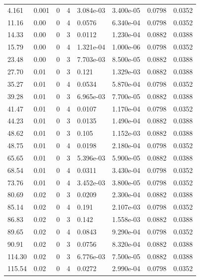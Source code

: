 \documentclass[preview]{standalone}
\begin{document}
{{\begin{tabular}{L{1.2cm}C{1.2cm} C{0.3cm}C{0.5cm} C{1.4cm}C{1.4cm} C{1.4cm}C{1.4cm}}
  4.161  &  0.001  & 0     &  4 &  3.084e-03  & 3.400e-05  & 0.0798 &  0.0352   \\ 
  11.16  &  0.00  & 0     &  4 &  0.0576  & 6.340e-04  & 0.0798 &  0.0352   \\ 
  14.33  &  0.00  & 0     &  3 &  0.0112  & 1.230e-04  & 0.0882 &  0.0388   \\ 
  15.79  &  0.00  & 0     &  4 &  1.321e-04  & 1.000e-06  & 0.0798 &  0.0352   \\ 
  23.48  &  0.00  & 0     &  3 &  7.703e-03  & 8.500e-05  & 0.0882 &  0.0388   \\ 
  27.70  &  0.01  & 0     &  3 &  0.121  & 1.329e-03  & 0.0882 &  0.0388   \\ 
  35.27  &  0.01  & 0     &  4 &  0.0534  & 5.870e-04  & 0.0798 &  0.0352   \\ 
  39.28  &  0.01  & 0     &  3 &  6.965e-03  & 7.700e-05  & 0.0882 &  0.0388   \\ 
  41.47  &  0.01  & 0     &  4 &  0.0107  & 1.170e-04  & 0.0798 &  0.0352   \\ 
  44.23  &  0.01  & 0     &  3 &  0.0135  & 1.490e-04  & 0.0882 &  0.0388   \\ 
  48.62  &  0.01  & 0     &  3 &  0.105  & 1.152e-03  & 0.0882 &  0.0388   \\ 
  48.75  &  0.01  & 0     &  4 &  0.0198  & 2.180e-04  & 0.0798 &  0.0352   \\ 
  65.65  &  0.01  & 0     &  3 &  5.396e-03  & 5.900e-05  & 0.0882 &  0.0388   \\ 
  68.54  &  0.01  & 0     &  4 &  0.0311  & 3.430e-04  & 0.0798 &  0.0352   \\ 
  73.76  &  0.01  & 0     &  4 &  3.452e-03  & 3.800e-05  & 0.0798 &  0.0352   \\ 
  80.69  &  0.02  & 0     &  3 &  0.0209  & 2.300e-04  & 0.0882 &  0.0388   \\ 
  85.14  &  0.02  & 0     &  4 &  0.191  & 2.107e-03  & 0.0798 &  0.0352   \\ 
  86.83  &  0.02  & 0     &  3 &  0.142  & 1.558e-03  & 0.0882 &  0.0388   \\ 
  89.65  &  0.02  & 0     &  4 &  0.0843  & 9.290e-04  & 0.0798 &  0.0352   \\ 
  90.91  &  0.02  & 0     &  3 &  0.0756  & 8.320e-04  & 0.0882 &  0.0388   \\ 
  114.30  &  0.02  & 0     &  3 &  6.776e-03  & 7.500e-05  & 0.0882 &  0.0388   \\ 
  115.54  &  0.02  & 0     &  4 &  0.0272  & 2.990e-04  & 0.0798 &  0.0352   \\ 

\end{tabular}}}
\end{document}
